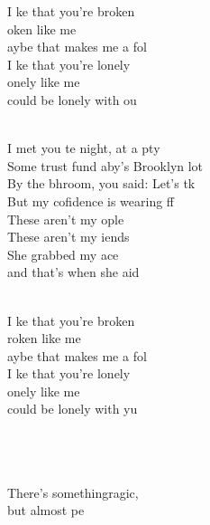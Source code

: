 \begin{cancion}[Broken][lovelytheband]%
	\begin{chorus}%
	I ke that you're broken\\
	oken like me\\
	aybe that makes me a fol\\
	I ke that you're lonely\\
	onely like me\\
	 could be lonely with ou\\
	\end{chorus}%
	\jump\\
	I met you te night, at a pty\\
	Some trust fund aby's Brooklyn lot\\
	By the bhroom, you said: Let's tk\\
	But my cofidence is wearing ff\\
\jump
	These aren't my ople\\
	These aren't my iends\\
	She grabbed my ace \\
	and that's when she aid\\\jump\\
	\begin{chorus}%
	I ke that you're broken\\
	roken like me\\
	aybe that makes me a fol\\
	I ke that you're lonely\\
	onely like me\\
	 could be lonely with yu\\
	\end{chorus}%
	\jump\\
{}\vspace*{-0.4cm}\\
	      \\
	There’s somethingragic, \\
	but almost pe\\

\end{cancion}
